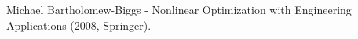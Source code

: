 \documentclass[12pt,a4paper]{report}
\numberwithin{equation}{section}
\theoremstyle{definition} %
\begin{document}
	\begin{thebibliography}{99}
		\thispagestyle{fancy}
		
		
		
		

		
		 Michael Bartholomew-Biggs - Nonlinear Optimization with Engineering Applications (2008, Springer).
		
		
		
		
		
		
		
		
	\end{thebibliography}
	
	\newpage %
	
	\thispagestyle{empty} %

	\mbox{}
\end{document}
